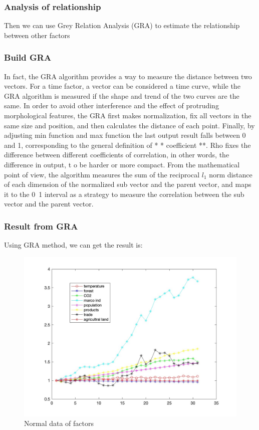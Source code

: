 \documentclass{apmcmthesis}
\begin{document}
\subsubsection{Analysis of relationship}
Then we can use Grey Relation Analysis (GRA) to estimate the relationship between other factors

\subsubsection{Build GRA}

In fact, the GRA algorithm provides a way to measure the distance between two vectors. 
For a time factor, a vector can be considered a time curve, while the GRA algorithm is measured if the shape and trend of the two curves are the same. 
In order to avoid other interference and the effect of protruding morphological features, the GRA first makes normalization, 
fix all vectors in the same size and position, and then calculates the distance of each point. 
Finally, by adjusting min function and max function the last output result falls between 0 and 1, corresponding to the general definition of * * coefficient **. 
Rho fixes the difference between different coefficients of correlation, in other words, the difference in output, t o be harder or more compact. 
From the mathematical point of view, the algorithm measures the sum of the reciprocal $l_1$ norm distance of each dimension of the normalized sub vector and the parent vector, 
and maps it to the 0~1 interval as a strategy to measure the correlation between the sub vector and the parent vector.

\subsubsection{Result from GRA}
Using GRA method, we can get the result is:
\begin{figure}[htbp]
  \centering
  \includegraphics[scale=0.25]{2c1.jpg}
  \caption{Normal data of factors}
\end{figure}
\end{document}
